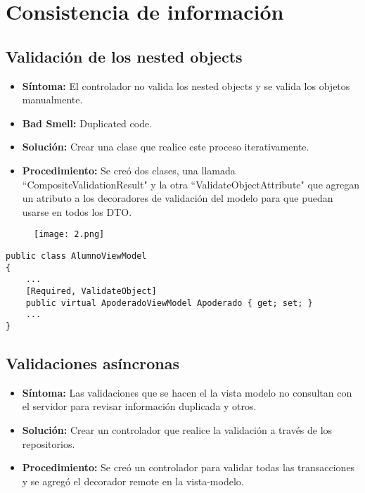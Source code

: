 \section{Consistencia de información}

\subsection{Validación de los nested objects}
\begin{itemize}
	\item \textbf{Síntoma:} El controlador no valida los nested objects y se valida los objetos manualmente.
	\item \textbf{Bad Smell:} Duplicated code.
	\item \textbf{Solución:} Crear una clase que realice este proceso iterativamente.
	\item \textbf{Procedimiento:} Se creó dos clases, una llamada ``CompositeValidationResult" y la otra ``ValidateObjectAttribute" que agregan un atributo a los decoradores de validación del modelo para que puedan usarse en todos los DTO.
\end{itemize}

\begin{figure}[h]
	\texttt{[image: 2.png]}
	\centering
\end{figure}

\begin{lstlisting}[language={[Sharp]C}]
public class AlumnoViewModel
{
	...
	[Required, ValidateObject]
	public virtual ApoderadoViewModel Apoderado { get; set; }
	...
}
\end{lstlisting}

\subsection{Validaciones asíncronas}
\begin{itemize}
	\item \textbf{Síntoma:} Las validaciones que se hacen el la vista modelo no consultan con el servidor para revisar información duplicada y otros.
	\item \textbf{Solución:} Crear un controlador que realice la validación a través de los repositorios.
	\item \textbf{Procedimiento:} Se creó un controlador para validar todas las transacciones y se agregó el decorador remote en la vista-modelo.
\end{itemize}


